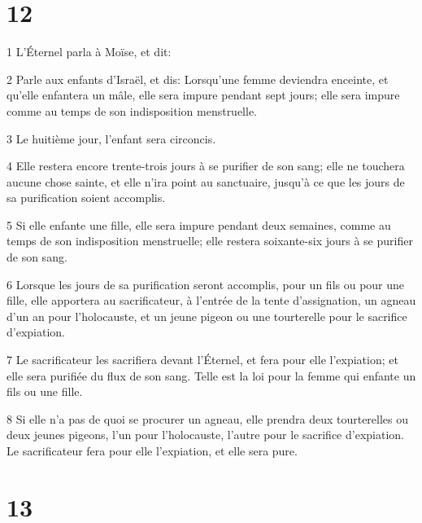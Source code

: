 \chapter{12}

\par 1 L'Éternel parla à Moïse, et dit:
\par 2 Parle aux enfants d'Israël, et dis: Lorsqu'une femme deviendra enceinte, et qu'elle enfantera un mâle, elle sera impure pendant sept jours; elle sera impure comme au temps de son indisposition menstruelle.
\par 3 Le huitième jour, l'enfant sera circoncis.
\par 4 Elle restera encore trente-trois jours à se purifier de son sang; elle ne touchera aucune chose sainte, et elle n'ira point au sanctuaire, jusqu'à ce que les jours de sa purification soient accomplis.
\par 5 Si elle enfante une fille, elle sera impure pendant deux semaines, comme au temps de son indisposition menstruelle; elle restera soixante-six jours à se purifier de son sang.
\par 6 Lorsque les jours de sa purification seront accomplis, pour un fils ou pour une fille, elle apportera au sacrificateur, à l'entrée de la tente d'assignation, un agneau d'un an pour l'holocauste, et un jeune pigeon ou une tourterelle pour le sacrifice d'expiation.
\par 7 Le sacrificateur les sacrifiera devant l'Éternel, et fera pour elle l'expiation; et elle sera purifiée du flux de son sang. Telle est la loi pour la femme qui enfante un fils ou une fille.
\par 8 Si elle n'a pas de quoi se procurer un agneau, elle prendra deux tourterelles ou deux jeunes pigeons, l'un pour l'holocauste, l'autre pour le sacrifice d'expiation. Le sacrificateur fera pour elle l'expiation, et elle sera pure.

\chapter{13}

